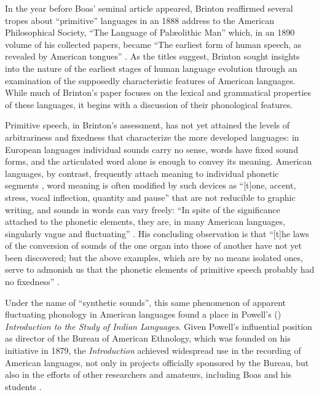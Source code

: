 \documentclass[output=paper]{langscibook}
\begin{document}
In the year before Boas' seminal article appeared, Brinton reaffirmed several tropes about ``primitive'' languages in an 1888 address to the American Philosophical Society, ``The Language of Palæolithic Man'' which, in an 1890 volume of his collected papers, became ``The earliest form of human speech, as revealed by American tongues'' \citep{Brinton18901888}. As the titles suggest, Brinton sought insights into the nature of the earliest stages of human language evolution through an examination of the supposedly characteristic features of American languages. While much of Brinton's paper focuses on the lexical and grammatical properties of these languages, it begins with a discussion of their phonological features.

Primitive speech, in Brinton's assessment, has not yet attained the levels of arbitrariness and fixedness that characterize the more developed languages: in European languages individual sounds carry no sense, words have fixed sound forms, and the articulated word alone is enough to convey its meaning. American languages, by contrast, frequently attach meaning to individual phonetic segments \citep[394]{Brinton18901888}, word meaning is often modified by such devices as ``[t]one, accent, stress, vocal inflection, quantity and pause'' \citep[399]{Brinton18901888} that are not reducible to graphic writing, and sounds in words can vary freely: ``In spite of the significance attached to the phonetic elements, they are, in many American languages, singularly vague and fluctuating'' \citep[397]{Brinton18901888}. His concluding observation is that ``[t]he laws of the conversion of sounds of the one organ into those of another have not yet been discovered; but the above examples, which are by no means isolated ones, serve to admonish us that the phonetic elements of primitive speech probably had no fixedness'' \citep[398-399]{Brinton18901888}.

Under the name of ``synthetic sounds'', this same phenomenon of apparent fluctuating phonology in American languages found a place in Powell's (\citeyear{Powell18801877}) \emph{Introduction to the Study of Indian Languages}. Given Powell's influential position as director of the Bureau of American Ethnology, which was founded on his initiative in 1879, the \emph{Introduction} achieved widespread use in the recording of American languages, not only in projects officially sponsored by the Bureau, but also in the efforts of other researchers and amateurs, including Boas and his students \citep[see][50-51]{Darnell1998}.
\end{document}
